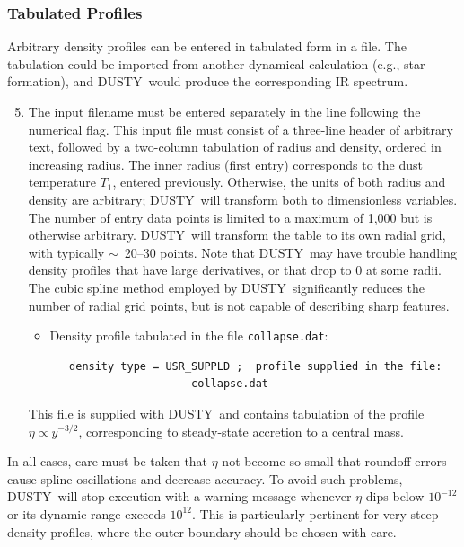 \documentclass[11pt]{article}
\def\D  {{\sf DUSTY}}
\def\E#1{\hbox{$10^{#1}$}}
\def\about  {\hbox{$\sim$}}
\begin{document}
\subsubsection{Tabulated Profiles}

Arbitrary density profiles can be entered in tabulated form in a file.  The
tabulation could be imported from another dynamical calculation (e.g., star
formation), and \D\ would produce the corresponding IR spectrum.

\begin{enumerate}
\setcounter{enumi}{4}
\item
The input filename must be entered separately in the line following the
numerical flag. This input file must consist of a three-line header of
arbitrary text, followed by a two-column tabulation of radius and density,
ordered in increasing radius.  The inner radius (first entry) corresponds to
the dust temperature $T_1$, entered previously.  Otherwise, the
units of both radius and density are arbitrary; \D\ will transform both to
dimensionless variables. The number of entry data points is limited to a
maximum of 1,000 but is otherwise arbitrary. \D\ will transform the table to
its own radial grid, with typically \about\ 20--30 points.  Note that \D\ may
have trouble handling density profiles that have large derivatives, or that
drop to 0 at some radii. The cubic spline method employed by \D\ significantly
reduces the number of radial grid points, but is not capable of describing
sharp features.

\begin{itemize}
\item Density profile tabulated in the file {\tt collapse.dat}:

\begin{verbatim}
   density type = USR_SUPPLD ;  profile supplied in the file:
                      collapse.dat
\end{verbatim}
\end{itemize}

This file is supplied with \D\ and contains tabulation of the profile $\eta
\propto y^{-3/2}$, corresponding to steady-state accretion to a central mass.

\end{enumerate}

In all cases, care must be taken that $\eta$ not become so small that roundoff
errors cause spline oscillations and decrease accuracy.  To avoid such
problems, \D\ will stop execution with a warning message whenever $\eta$ dips
below \E{-12} or its dynamic range exceeds \E{12}.  This is particularly
pertinent for very steep density profiles, where the outer boundary should be
chosen with care.
\end{document}
